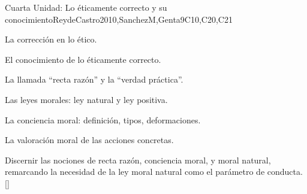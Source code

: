 \begin{syllabus}
\begin{unit}{}{Cuarta Unidad: Lo éticamente correcto y su conocimiento}{ReydeCastro2010,SanchezM,Genta}{9}{C10,C20,C21}
\begin{topics}
    \item La corrección en lo ético.
    \item El conocimiento de lo éticamente correcto.
    \item La llamada ``recta razón'' y la ``verdad práctica''.
    \item Las leyes morales: ley natural y ley positiva.
    \item La conciencia moral: definición, tipos, deformaciones.
    \item La valoración moral de las acciones concretas.
\end{topics}

\begin{learningoutcomes}
	\item Discernir las nociones de recta razón, conciencia moral, y moral natural, remarcando la necesidad de la ley moral natural como el parámetro de conducta.[\Familiarity]
\end{learningoutcomes}
\end{unit}

\begin{coursebibliography}
\end{coursebibliography}

\end{syllabus}
